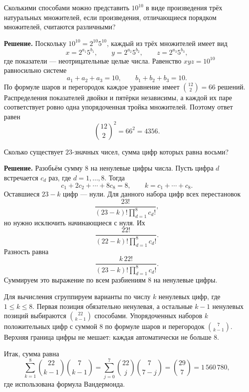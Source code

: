 \begin{problems}
\item Сколькими способами можно представить $10^{10}$ в виде произведения трёх натуральных множителей, если произведения, отличающиеся порядком множителей, считаются различными?
\par\smallskip\noindent\textbf{Решение.} Поскольку $10^{10}=2^{10}5^{10}$, каждый из трёх множителей имеет вид
\[
x=2^{a_1}5^{b_1},\qquad y=2^{a_2}5^{b_2},\qquad z=2^{a_3}5^{b_3},
\]
где показатели --- неотрицательные целые числа. Равенство $xyz=10^{10}$ равносильно системе
\[
a_1+a_2+a_3=10,\qquad b_1+b_2+b_3=10.
\]
По формуле шаров и перегородок каждое уравнение имеет $\binom{12}{2}=66$ решений. Распределения показателей двойки и пятёрки независимы, а каждой их паре соответствует ровно одна упорядоченная тройка множителей. Поэтому ответ равен
\[
\binom{12}{2}^{\!2}=66^2=4356.
\]\par

\item Сколько существует $23$-значных чисел, сумма цифр которых равна восьми?
\par\smallskip\noindent\textbf{Решение.} Разобьём сумму $8$ на ненулевые цифры числа. Пусть цифра $d$ встречается $c_d$ раз, где $d=1,\ldots,8$. Тогда
\[
c_1+2c_2+\cdots+8c_8=8,
\qquad k=c_1+\cdots+c_8.
\]
Оставшиеся $23-k$ цифр --- нули. Для данного набора цифр всех перестановок
\[
\frac{23!}{(23-k)!\prod_{d=1}^{8}c_d!},
\]
но нужно исключить начинающиеся с нуля. Их
\[
\frac{22!}{(22-k)!\prod_{d=1}^{8}c_d!}.
\]
Разность равна
\[
\frac{k\,22!}{(23-k)!\prod_{d=1}^{8}c_d!}.
\]
Суммируем это выражение по всем разбиениям $8$ на ненулевые цифры.
\par Для вычисления сгруппируем варианты по числу $k$ ненулевых цифр, где $1\le k\le8$. Первая позиция обязательно ненулевая, а остальные $k-1$ ненулевых позиций выбираются $\binom{22}{k-1}$ способами. Упорядоченных наборов $k$ положительных цифр с суммой $8$ по формуле шаров и перегородок $\binom7{k-1}$. Верхняя граница цифры не мешает: каждая автоматически не больше $8$.
\par Итак, сумма равна
\[
\sum_{k=1}^{8}\binom{22}{k-1}\binom7{k-1}
=\sum_{j=0}^{7}\binom{22}{j}\binom7{7-j}
=\binom{29}{7}
=1\,560\,780,
\]
где использована формула Вандермонда.\par


\end{problems}
